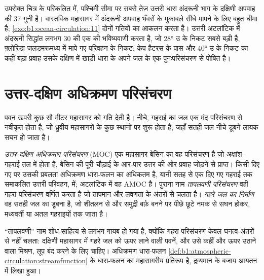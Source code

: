उपरोक्त चित्र के परिकलित  में, पश्चिमी सीमा पर सबसे तेज़ उत्तरी धारा अंदरूनी भाग के दक्षिणी अपवाह की \num{37} गुनी है। वास्तविक महासागर में अंदरूनी अपवाह भँवरों के मुकाबले सीधे मापने के लिए बहुत धीमा है; \cref{exo:b1:ocean-circulation:11} दोनों गतियों का आकलन करता है। उत्तरी अटलांटिक में अंदरूनी सिद्धांत लगभग \qty{30}{\sverdrup} की एक  की भविष्यवाणी करता है, जो \ang{28} उ के निकट सबसे बड़ी है, फ़्लोरिडा जलडमरूमध्य में मापे गए परिवहन के निकट; केप हैटरस के पास और \ang{40} उ के निकट का कहीं बड़ा प्रवाह उसके दक्षिण में खाड़ी धारा के अपने जल के एक पुनःपरिसंचरण से पोषित है।

\section{उत्तर-दक्षिण अधिक्रमण परिसंचरण}\label{sec:b1:ocean-circulation:moc}

पवन ऊपरी कुछ सौ मीटर महासागर को गति देती है। नीचे, गहराई का जल एक मंद परिसंचरण से नवीकृत होता है, जो ध्रुवीय महासागरों के कुछ स्थानों पर शुरू होता है, जहाँ सतही जल नीचे डूबने लायक सघन हो जाता है।

\begin{definition}\label{def:b1:ocean-circulation:moc}
\emph{उत्तर-दक्षिण अधिक्रमण परिसंचरण} (MOC) एक महासागर बेसिन का वह परिसंचरण है जो अक्षांश--गहराई तल में होता है, बेसिन की पूरी चौड़ाई के आर-पार उत्तर की ओर प्रवाह जोड़ने से प्राप्त। किसी दिए गए  पर उसकी प्रबलता अधिक्रमण धारा-फलन का अधिकतम है, यानी सतह से एक दिए गए गहराई तक समाकलित उत्तरी परिवहन,  में; अटलांटिक में वह AMOC है। पुराना नाम \emph{तापलवणी परिसंचरण} वही गहरा परिसंचरण वर्णित करता है जो तापमान और लवणता के अंतरों से चलता है। \emph{गहरे जल का निर्माण} वह सतही जल का डूबना है, जो शीतलन से और समुद्री बर्फ़ बनने पर पीछे छूटे नमक से सघन होकर, मध्यवर्ती या अतल गहराइयों तक जाता है।
\end{definition}

``तापलवणी'' नाम शोध-साहित्य से लगभग गायब हो गया है, क्योंकि गहरा परिसंचरण केवल घनत्व-अंतरों से नहीं चलता: दक्षिणी महासागर में गहरे जल को ऊपर लाने वाली पवनें, और उसे कहीं और ऊपर उठाने वाला मिश्रण, लूप बंद करने के लिए चाहिए। अधिक्रमण धारा-फलन \cref{def:b1:atmospheric-circulation:streamfunction} के धारा-फलन का महासागरीय प्रतिरूप है, द्रव्यमान के बजाय आयतन में लिखा हुआ।

